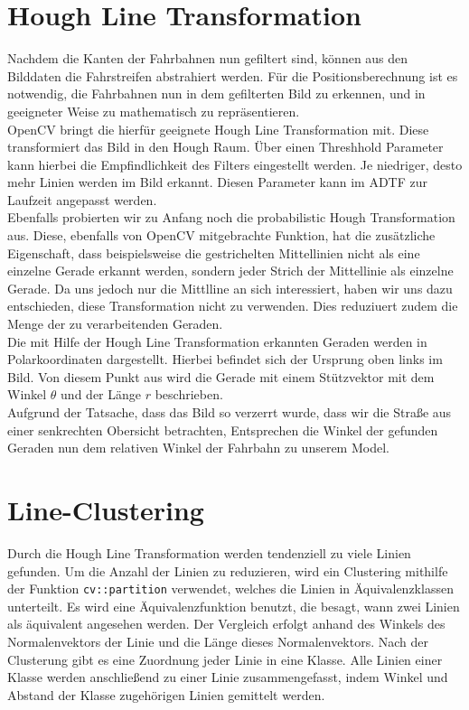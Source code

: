 \documentclass[a4paper,12pt]{report}
\begin{document}
\section{Hough Line Transformation}
	Nachdem die Kanten der Fahrbahnen nun gefiltert sind, können aus den Bilddaten die Fahrstreifen abstrahiert werden. Für die Positionsberechnung ist es notwendig, die Fahrbahnen nun in dem gefilterten Bild zu erkennen, und in geeigneter Weise zu mathematisch zu repräsentieren. \\
	OpenCV bringt die hierfür geeignete Hough Line Transformation mit. Diese transformiert das Bild in den Hough Raum. Über einen Threshhold Parameter kann hierbei die Empfindlichkeit des Filters eingestellt werden. Je niedriger, desto mehr Linien werden im Bild erkannt. Diesen Parameter kann im ADTF zur Laufzeit angepasst werden.\\
	Ebenfalls probierten wir zu Anfang noch die probabilistic Hough Transformation aus. Diese, ebenfalls von OpenCV mitgebrachte Funktion, hat die zusätzliche Eigenschaft, dass beispielsweise die gestrichelten Mittellinien nicht als eine einzelne Gerade erkannt werden, sondern jeder Strich der Mittellinie als einzelne Gerade. Da uns jedoch nur die Mittlline an sich interessiert, haben wir uns dazu entschieden, diese Transformation nicht zu verwenden. Dies reduziuert zudem die Menge der zu verarbeitenden Geraden.\\
	Die mit Hilfe der Hough Line Transformation erkannten Geraden werden in Polarkoordinaten dargestellt. Hierbei befindet sich der Ursprung oben links im Bild. Von diesem Punkt aus wird die Gerade mit einem Stützvektor mit dem Winkel $\theta$ und der Länge $r$ beschrieben.\\
	Aufgrund der Tatsache, dass das Bild so verzerrt wurde, dass wir die Straße aus einer senkrechten Obersicht betrachten, Entsprechen die Winkel der gefunden Geraden nun dem relativen Winkel der Fahrbahn zu unserem Model.

\section{Line-Clustering}
	Durch die Hough Line Transformation werden tendenziell zu viele Linien gefunden. Um die Anzahl der Linien zu reduzieren, wird ein Clustering mithilfe der Funktion \texttt{cv::partition} verwendet, welches die Linien in Äquivalenzklassen unterteilt. Es wird eine Äquivalenzfunktion benutzt, die besagt, wann zwei Linien als äquivalent angesehen werden. Der Vergleich erfolgt anhand des Winkels des Normalenvektors der Linie und die Länge dieses Normalenvektors. Nach der Clusterung gibt es eine Zuordnung jeder Linie in eine Klasse. Alle Linien einer Klasse werden anschließend zu einer Linie zusammengefasst, indem Winkel und Abstand der Klasse zugehörigen Linien gemittelt werden.
\end{document}
